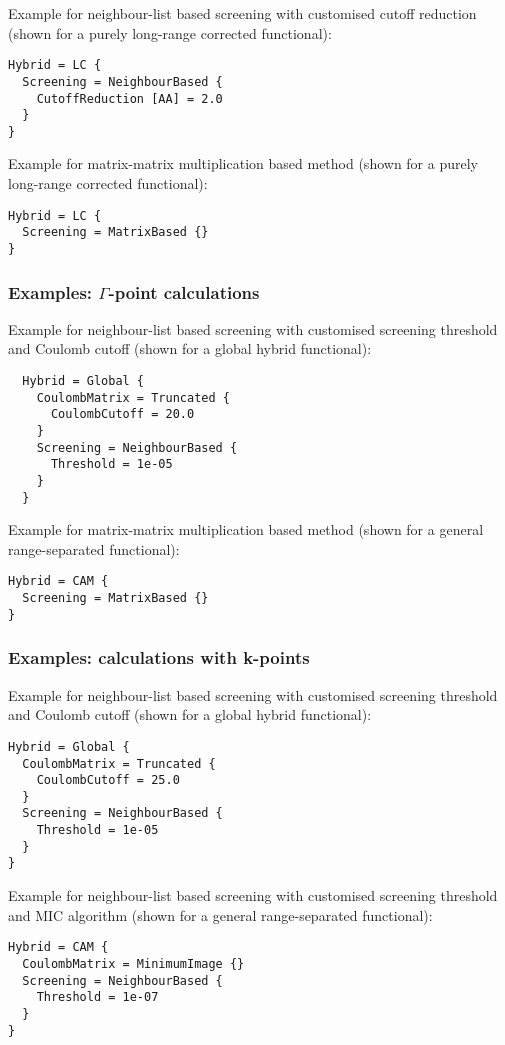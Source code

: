 Example for neighbour-list based screening with customised cutoff reduction
(shown for a purely long-range corrected functional):
\begin{verbatim}
Hybrid = LC {
  Screening = NeighbourBased {
    CutoffReduction [AA] = 2.0
  }
}
\end{verbatim}

Example for matrix-matrix multiplication based method (shown for a purely
long-range corrected functional):
\begin{verbatim}
Hybrid = LC {
  Screening = MatrixBased {}
}
\end{verbatim}

\subsubsection{Examples: $\Gamma$-point calculations}
Example for neighbour-list based screening with customised screening threshold
and Coulomb cutoff (shown for a global hybrid functional):
\begin{verbatim}
  Hybrid = Global {
    CoulombMatrix = Truncated {
      CoulombCutoff = 20.0
    }
    Screening = NeighbourBased {
      Threshold = 1e-05
    }
  }
\end{verbatim}

Example for matrix-matrix multiplication based method (shown for a general
range-separated functional):
\begin{verbatim}
Hybrid = CAM {
  Screening = MatrixBased {}
}
\end{verbatim}

\subsubsection{Examples: calculations with k-points}
Example for neighbour-list based screening with customised screening threshold and Coulomb
cutoff (shown for a global hybrid functional):
\begin{verbatim}
Hybrid = Global {
  CoulombMatrix = Truncated {
    CoulombCutoff = 25.0
  }
  Screening = NeighbourBased {
    Threshold = 1e-05
  }
}
\end{verbatim}

Example for neighbour-list based screening with customised screening threshold and MIC
algorithm (shown for a general range-separated functional):
\begin{verbatim}
Hybrid = CAM {
  CoulombMatrix = MinimumImage {}
  Screening = NeighbourBased {
    Threshold = 1e-07
  }
}
\end{verbatim}

